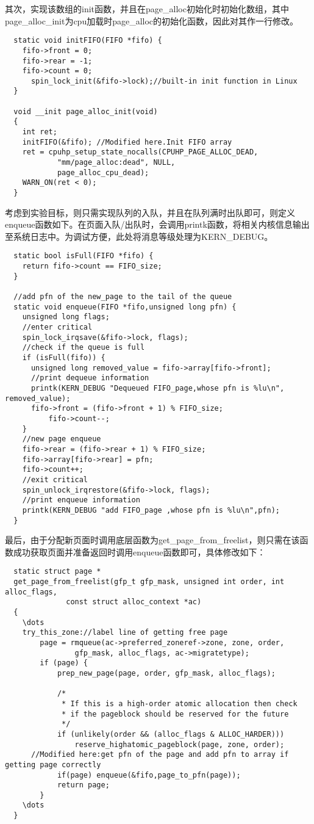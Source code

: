 \documentclass[11pt, a4paper, oneside,UTF8]{ctexart}
\begin{document}
其次，实现该数组的init函数，并且在page\_alloc初始化时初始化数组，其中page\_alloc\_init为cpu加载时page\_alloc的初始化函数，因此对其作一行修改。
\begin{lstlisting}
  static void initFIFO(FIFO *fifo) {
    fifo->front = 0;
    fifo->rear = -1;
    fifo->count = 0;
	  spin_lock_init(&fifo->lock);//built-in init function in Linux
  }

  void __init page_alloc_init(void)
  {
    int ret;
    initFIFO(&fifo); //Modified here.Init FIFO array
    ret = cpuhp_setup_state_nocalls(CPUHP_PAGE_ALLOC_DEAD,
            "mm/page_alloc:dead", NULL,
            page_alloc_cpu_dead);
    WARN_ON(ret < 0);
  }
\end{lstlisting}

考虑到实验目标，则只需实现队列的入队，并且在队列满时出队即可，则定义enqueue函数如下。在页面入队/出队时，会调用printk函数，将相关内核信息输出至系统日志中。为调试方便，此处将消息等级处理为KERN\_DEBUG。

\begin{lstlisting}
  static bool isFull(FIFO *fifo) {
    return fifo->count == FIFO_size;
  }

  //add pfn of the new_page to the tail of the queue
  static void enqueue(FIFO *fifo,unsigned long pfn) {
    unsigned long flags;
    //enter critical
    spin_lock_irqsave(&fifo->lock, flags); 
    //check if the queue is full
    if (isFull(fifo)) {
      unsigned long removed_value = fifo->array[fifo->front];
      //print dequeue information
      printk(KERN_DEBUG "Dequeued FIFO_page,whose pfn is %lu\n", removed_value);
      fifo->front = (fifo->front + 1) % FIFO_size;
          fifo->count--;
    }
    //new page enqueue
    fifo->rear = (fifo->rear + 1) % FIFO_size;
    fifo->array[fifo->rear] = pfn;
    fifo->count++;
    //exit critical
    spin_unlock_irqrestore(&fifo->lock, flags);
    //print enqueue information
    printk(KERN_DEBUG "add FIFO_page ,whose pfn is %lu\n",pfn);
  }
\end{lstlisting}

最后，由于分配新页面时调用底层函数为get\_page\_from\_freelist，则只需在该函数成功获取页面并准备返回时调用enqueue函数即可，具体修改如下：
\begin{lstlisting}
  static struct page *
  get_page_from_freelist(gfp_t gfp_mask, unsigned int order, int alloc_flags,
              const struct alloc_context *ac)
  {
    \dots
    try_this_zone://label line of getting free page
		page = rmqueue(ac->preferred_zoneref->zone, zone, order,
				gfp_mask, alloc_flags, ac->migratetype);
		if (page) {
			prep_new_page(page, order, gfp_mask, alloc_flags);

			/*
			 * If this is a high-order atomic allocation then check
			 * if the pageblock should be reserved for the future
			 */
			if (unlikely(order && (alloc_flags & ALLOC_HARDER)))
				reserve_highatomic_pageblock(page, zone, order);
      //Modified here:get pfn of the page and add pfn to array if getting page correctly
			if(page) enqueue(&fifo,page_to_pfn(page));
			return page;
		}
    \dots
  }
\end{lstlisting}
\end{document}
